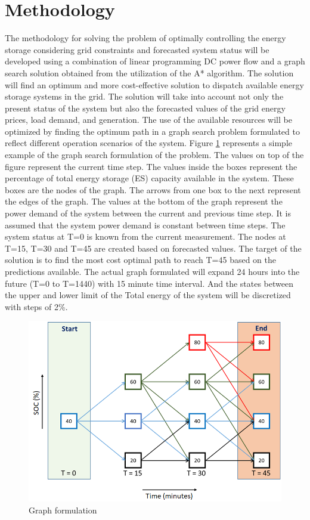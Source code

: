 \documentclass[journal]{IEEEtran}
\begin{document}
\section{Methodology}
The methodology for solving the problem of optimally controlling the energy storage considering grid constraints and forecasted system status will be developed using a combination of linear programming DC power flow and a graph search solution obtained from the utilization of the A* \cite{a8book} algorithm. The solution will find an optimum and more cost-effective solution to dispatch available energy storage systems in the grid. The solution will take into account not only the present status of the system but also the forecasted values of the grid energy prices, load demand, and generation. The use of the available resources will be optimized by finding the optimum path in a graph search problem formulated to reflect different operation scenarios of the system. Figure \ref{fig:F1_1_Dis} represents a simple example of the graph search formulation of the problem. The values on top of the figure represent the current time step. The values inside the boxes represent the percentage of total energy storage (ES) capacity available in the system. These boxes are the nodes of the graph. The arrows from one box to the next represent the edges of the graph. The values at the bottom of the graph represent the power demand of the system between the current and previous time step. It is assumed that the system power demand is constant between time steps. The system status at T=0 is known from the current measurement. The nodes at T=15, T=30 and T=45 are created based on forecasted values. The target of the solution is to find the most cost optimal path to reach T=45 based on the predictions available. The actual graph formulated will expand 24 hours into the future (T=0 to T=1440) with 15 minute time interval. And the states between the upper and lower limit of the Total energy of the system will be discretized with steps of 2\%.

\begin{figure}[!ht]
\centering
\includegraphics[width = \linewidth]{figs/F1_1_Dis.png}
\caption{Graph formulation}
\label{fig:F1_1_Dis}
\end{figure}
\end{document}
